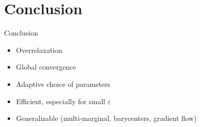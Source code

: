 \documentclass[compress]{beamer}
\renewcommand{\epsilon}{\varepsilon}
\begin{document}
\section*{Conclusion}
\begin{frame}{Conclusion}
	\begin{itemize}
		\item Overrelaxation
		\item Global convergence
		\item Adaptive choice of parameters
		\item Efficient, especially for small $\epsilon$
		\item Generalizable (multi-marginal, barycenters, gradient flow)
	\end{itemize}
\end{frame}
\end{document}
